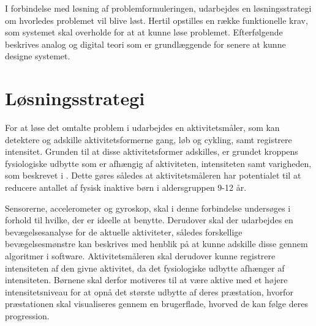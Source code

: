 I forbindelse med løsning af problemformuleringen, udarbejdes en løsningsstrategi om hvorledes problemet vil blive løst. Hertil opstilles en række funktionelle krav, som systemet skal overholde for at at kunne løse problemet. Efterfølgende beskrives analog og digital teori som er grundlæggende for senere at kunne designe systemet.

\section{Løsningsstrategi}

For at løse det omtalte problem i  udarbejdes en aktivitetsmåler, som kan detektere og adskille aktivitetsformerne gang, løb og cykling, samt registrere intensitet. Grunden til at disse aktivitetsformer adskilles, er grundet kroppens fysiologiske udbytte som er afhængig af aktiviteten, intensiteten samt varigheden, som beskrevet i . Dette gøres således at aktivitetsmåleren har potentialet til at reducere antallet af fysisk inaktive børn i aldersgruppen 9-12 år.

Sensorerne, accelerometer og gyroskop, skal i denne forbindelse undersøges i forhold til hvilke, der er ideelle at benytte. Derudover skal der udarbejdes en bevægelsesanalyse for de aktuelle aktiviteter, således forskellige bevægelsesmønstre kan beskrives med henblik på at kunne adskille disse gennem algoritmer i software. Aktivitetsmåleren skal derudover kunne registrere intensiteten af den givne aktivitet, da det fysiologiske udbytte afhænger af intensiteten. Børnene skal derfor motiveres til at være aktive med et højere intensitetsniveau for at opnå det største udbytte af deres præstation, hvorfor præstationen skal visualiseres gennem en brugerflade, hvorved de kan følge deres progression.





